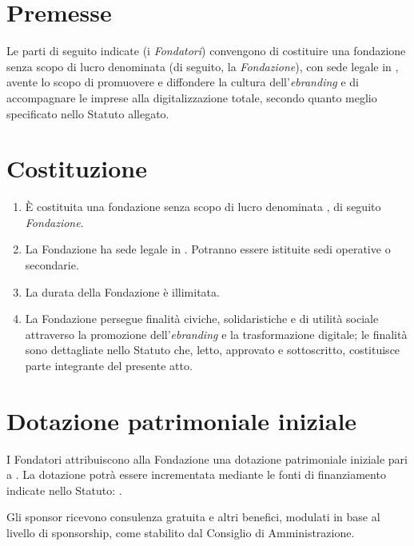 \maketitle

\section*{Premesse}
Le parti di seguito indicate (i \emph{Fondatori}) convengono di costituire una fondazione senza scopo di lucro denominata  (di seguito, la \emph{Fondazione}), con sede legale in \FondazioneSedeLegale, avente lo scopo di promuovere e diffondere la cultura dell'\emph{ebranding} e di accompagnare le imprese alla digitalizzazione totale, secondo quanto meglio specificato nello Statuto allegato.

\section*{Costituzione}
\begin{enumerate}[label=\arabic*)]
  \item È costituita una fondazione senza scopo di lucro denominata , di seguito \emph{Fondazione}.
  \item La Fondazione ha sede legale in . Potranno essere istituite sedi operative o secondarie.
  \item La durata della Fondazione è illimitata.
  \item La Fondazione persegue finalità civiche, solidaristiche e di utilità sociale attraverso la promozione dell'\emph{ebranding} e la trasformazione digitale; le finalità sono dettagliate nello Statuto che, letto, approvato e sottoscritto, costituisce parte integrante del presente atto.
\end{enumerate}

\section*{Dotazione patrimoniale iniziale}
I Fondatori attribuiscono alla Fondazione una dotazione patrimoniale iniziale pari a . La dotazione potrà essere incrementata mediante le fonti di finanziamento indicate nello Statuto: \FontiFinanziamento.

Gli sponsor ricevono consulenza gratuita e altri benefici, modulati in base al livello di sponsorship, come stabilito dal Consiglio di Amministrazione.

